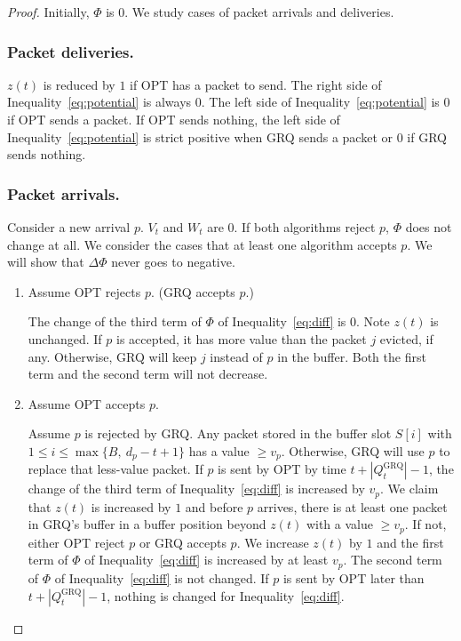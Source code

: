 \documentclass[final, 11pt]{article}
\begin{document}
\begin{proof}
Initially, $\Phi$ is $0$. We study cases of packet arrivals and deliveries.



\subsubsection{Packet deliveries.}

$z(t)$ is reduced by $1$ if OPT has a packet to send. The right side of Inequality~\ref{eq:potential} is always $0$. The left side of Inequality~\ref{eq:potential} is $0$ if OPT sends a packet. If OPT sends nothing, the left side of Inequality~\ref{eq:potential} is strict positive when GRQ sends a packet or $0$ if GRQ sends nothing.



\subsubsection{Packet arrivals.}

Consider a new arrival $p$. $V_t$ and $W_t$ are $0$. If both algorithms reject $p$, $\Phi$ does not change at all. We consider the cases that at least one algorithm accepts $p$. We will show that $\Delta \Phi$ never goes to negative.

\begin{enumerate}
\item Assume OPT rejects $p$. (GRQ accepts $p$.)

The change of the third term of $\Phi$ of Inequality~\ref{eq:diff} is $0$. Note $z(t)$ is unchanged. If $p$ is accepted, it has more value than the packet $j$ evicted, if any. Otherwise, GRQ will keep $j$ instead of $p$ in the buffer. Both the first term and the second term will not decrease.

\item Assume OPT accepts $p$.

Assume $p$ is rejected by GRQ. Any packet stored in the buffer slot $S[i]$ with $1 \le i \le \max\{B, \ d_p - t + 1\}$ has a value $\ge v_p$. Otherwise, GRQ will use $p$ to replace that less-value packet. If $p$ is sent by OPT by time $t + |Q^\text{GRQ}_t| - 1$, the change of the third term of Inequality~\ref{eq:diff} is increased by $v_p$. We claim that $z(t)$ is increased by $1$ and before $p$ arrives, there is at least one packet in GRQ's buffer in a buffer position beyond $z(t)$ with a value $\ge v_p$. If not, either OPT reject $p$ or GRQ accepts $p$. We increase $z(t)$ by $1$ and the first term of $\Phi$ of Inequality~\ref{eq:diff} is increased by at least $v_p$. The second term of $\Phi$ of Inequality~\ref{eq:diff} is not changed. If $p$ is sent by OPT later than $t + |Q^\text{GRQ}_t| - 1$, nothing is changed for Inequality~\ref{eq:diff}.


\end{enumerate}
\end{proof}
\end{document}
